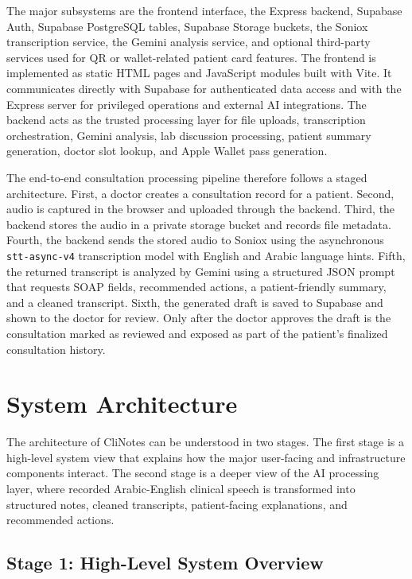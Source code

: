 The major subsystems are the frontend interface, the Express backend, Supabase Auth, Supabase PostgreSQL tables, Supabase Storage buckets, the Soniox transcription service, the Gemini analysis service, and optional third-party services used for QR or wallet-related patient card features. The frontend is implemented as static HTML pages and JavaScript modules built with Vite. It communicates directly with Supabase for authenticated data access and with the Express server for privileged operations and external AI integrations. The backend acts as the trusted processing layer for file uploads, transcription orchestration, Gemini analysis, lab discussion processing, patient summary generation, doctor slot lookup, and Apple Wallet pass generation.

The end-to-end consultation processing pipeline therefore follows a staged architecture. First, a doctor creates a consultation record for a patient. Second, audio is captured in the browser and uploaded through the backend. Third, the backend stores the audio in a private storage bucket and records file metadata. Fourth, the backend sends the stored audio to Soniox using the asynchronous \texttt{stt-async-v4} transcription model with English and Arabic language hints. Fifth, the returned transcript is analyzed by Gemini using a structured JSON prompt that requests SOAP fields, recommended actions, a patient-friendly summary, and a cleaned transcript. Sixth, the generated draft is saved to Supabase and shown to the doctor for review. Only after the doctor approves the draft is the consultation marked as reviewed and exposed as part of the patient's finalized consultation history.

\section{System Architecture}
\label{sec:system-architecture}

The architecture of CliNotes can be understood in two stages. The first stage is a high-level system view that explains how the major user-facing and infrastructure components interact. The second stage is a deeper view of the AI processing layer, where recorded Arabic-English clinical speech is transformed into structured notes, cleaned transcripts, patient-facing explanations, and recommended actions.

\subsection{Stage 1: High-Level System Overview}
\label{subsec:high-level-architecture}

